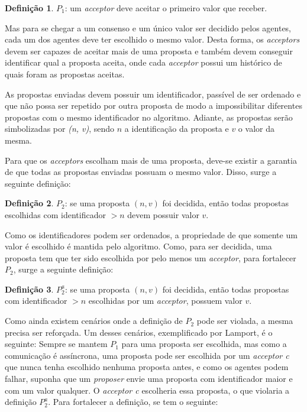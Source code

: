 \documentclass[
    12pt,
    openright, 
    oneside,
    a4paper,
    french,
    english,
    brazil
    ]{facom-ufu-abntex2}
\theoremstyle{definition}
\newtheorem{definition}{Definição}
\begin{document}
\begin{definition}
$P_1$: um \emph{acceptor} deve aceitar o primeiro valor que receber.
\end{definition}

Mas para se chegar a um consenso e um único valor ser decidido pelos agentes, cada um
dos agentes deve ter escolhido o mesmo valor. Desta forma, os \emph{acceptors} devem
ser capazes de aceitar mais de uma proposta e também devem conseguir identificar qual
a proposta aceita, onde cada \emph{acceptor} possui um histórico de quais foram as
propostas aceitas.

As propostas enviadas devem possuir um identificador, passível de ser ordenado e que não 
possa ser repetido por outra proposta de modo a impossibilitar diferentes propostas com o mesmo
identificador no algoritmo. Adiante, as propostas serão simbolizadas por 
\emph{(n, v)}, sendo $n$ a identificação da proposta e $v$ o valor da mesma.

Para que os \emph{acceptors} escolham mais de uma proposta, deve-se existir a garantia de
que todas as propostas enviadas possuam o mesmo valor. Disso, surge a seguinte definição:

\begin{definition}
$P_2$: se uma proposta $(n, v)$ foi decidida, então todas propostas escolhidas com 
identificador $>n$ devem possuir valor $v$.
\end{definition}

Como os identificadores podem ser ordenados, a propriedade de que somente um valor é escolhido
é mantida pelo algoritmo. Como, para ser decidida, uma proposta tem que ter sido escolhida
por pelo menos um \emph{acceptor}, para fortalecer $P_2$, surge a seguinte definição:

\begin{definition}
$P_2^a$: se uma proposta $(n, v)$ foi decidida, então todas propostas com identificador
$>n$ escolhidas por um \emph{acceptor}, possuem valor $v$.
\end{definition}

Como ainda existem cenários onde a definição de $P_2$ pode ser violada, a mesma precisa ser
reforçada. Um desses cenários, exemplificado por Lamport, é o seguinte:
Sempre se mantem $P_1$ para uma proposta ser escolhida, mas como
a comunicação é assíncrona, uma proposta pode ser escolhida por um \emph{acceptor c} 
que nunca tenha escolhido nenhuma proposta antes, e como os agentes podem falhar, suponha
que um \emph{proposer} envie uma proposta com identificador maior e com um valor qualquer.
O \emph{acceptor c} escolheria essa proposta, o que violaria a definição $P_2^a$. Para
fortalecer a definição, se tem o seguinte:
\end{document}
